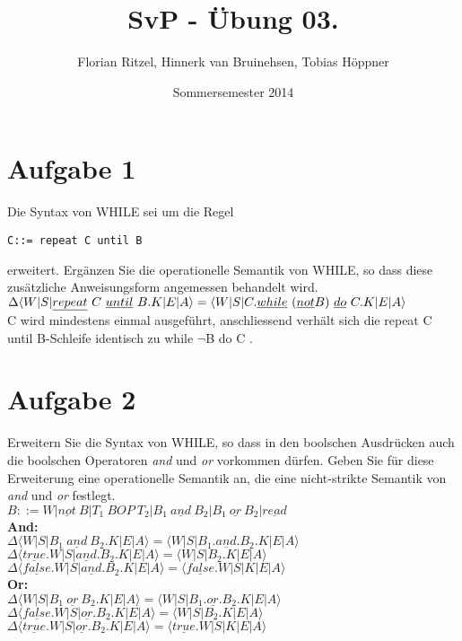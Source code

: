 \documentclass[ngerman,a4paper]{report}
\author{Florian Ritzel, Hinnerk van Bruinehsen, Tobias Höppner}
\title{SvP - Übung 03. }
\date{Sommersemester 2014}
\renewcommand{\maketitle}{}
\begin{document}
\maketitle
\section*{Aufgabe 1}
Die Syntax von WHILE sei um die Regel
\begin{lstlisting}
C::= repeat C until B
\end{lstlisting}
erweitert. Ergänzen Sie die operationelle Semantik von WHILE, so dass diese zusätzliche Anweisungsform angemessen behandelt wird.\\

$\Delta\langle W|S|\underline{repeat}\ C\ \underline{until}\ B.K|E|A\rangle = \langle W|S|C.\underline{while}\ (\underline{not}\\ B)\ \underline{do}\ C.K|E|A\rangle$\\
C wird mindestens einmal ausgeführt, anschliessend verhält sich die \glqq repeat C until B\grqq -Schleife identisch zu \glqq while $\neg$B do C \grqq .\\

\section*{Aufgabe 2}
Erweitern Sie die Syntax von WHILE, so dass in den boolschen Ausdrücken auch die boolschen Operatoren \textit{and} und \textit{or} vorkommen dürfen. Geben Sie für diese Erweiterung eine operationelle Semantik an, die eine nicht-strikte Semantik von \textit{and} und \textit{or} festlegt.\\

$B::=W| \underline{not}\ B| T_1\ BOP\ T_2| B_1\ \underline{and}\  B_2| B_1\ \underline{or}\ B_2| \underline{read}$\\

\textbf{And:}\\
$\Delta\langle W|S|B_1\ \underline{and}\ B_2.K|E|A\rangle = \langle W|S|B_1.\underline{and}.B_2.K|E|A\rangle$\\
$\Delta\langle \underline{true}.W|S|\underline{and}.B_2.K|E|A\rangle = \langle W|S|B_2.K|E|A\rangle$\\
$\Delta\langle \underline{false}.W|S|\underline{and}.B_2.K|E|A\rangle = \langle \underline{false}.W|S|K|E|A\rangle$\\

\textbf{Or:}\\
$\Delta\langle W|S|B_1\ \underline{or}\ B_2.K|E|A\rangle = \langle W|S|B_1.\underline{or}.B_2.K|E|A\rangle$\\
$\Delta\langle \underline{false}.W|S|\underline{or}.B_2.K|E|A\rangle = \langle W|S|B_2.K|E|A\rangle$\\
$\Delta\langle \underline{true}.W|S|\underline{or}.B_2.K|E|A\rangle = \langle \underline{true}.W|S|K|E|A\rangle$\\
\end{document}
